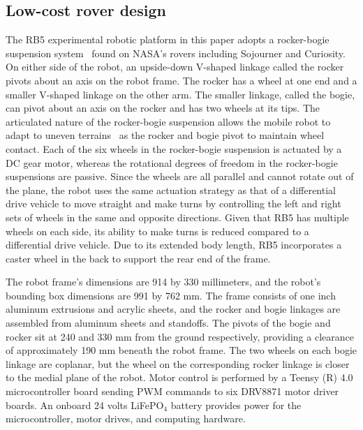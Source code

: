 \documentclass[letterpaper,10pt,conference,twoside]{IEEEtran}
\theoremstyle{definition}
\begin{document}
\subsection{Low-cost %
rover design}
\label{sec:md}
\noindent
The RB5 experimental robotic platform in this paper adopts a rocker-bogie suspension system~\cite{bickler1989articulated} found on NASA's rovers including Sojourner and Curiosity. On either side of the robot, an upside-down V-shaped linkage called the rocker pivots about an axis on the robot frame. The rocker has a wheel at one end and a smaller V-shaped linkage on the other arm. The smaller linkage, called the bogie, can pivot about an axis on the rocker and has two wheels at its tips. The articulated nature of the rocker-bogie suspension allows the mobile robot to adapt to uneven terrains~\cite{%
faisal2021low} as the rocker and bogie pivot to maintain wheel contact. %
%
Each of the six wheels in the rocker-bogie suspension is actuated by a DC gear motor, whereas the rotational degrees of freedom in the rocker-bogie suspensions are passive. Since the wheels are all parallel and cannot rotate out of the plane, the robot uses the same actuation strategy as that of a differential drive vehicle to move straight and make turns by controlling the left and right sets of wheels in the same and opposite directions. Given that RB5 has multiple wheels on each side, its ability to make turns is reduced compared to a differential drive vehicle. Due to its extended body length, RB5 incorporates a caster wheel in the back to support the rear end of the frame.

The robot frame's dimensions are 914 by 330 millimeters, and the robot's bounding box dimensions are 991 by 762 mm. The frame consists of one inch aluminum extrusions and acrylic sheets, and the rocker and bogie linkages are assembled from aluminum sheets and standoffs. The pivots of the bogie and rocker sit at 240 and 330 mm from the ground respectively, providing a clearance of approximately 190 mm beneath the robot frame. The two wheels on each bogie linkage are coplanar, but the wheel on the corresponding rocker linkage is closer to the medial plane of the robot. Motor control is performed by a Teensy (R) 4.0 microcontroller board sending PWM commands to six DRV8871 motor driver boards. An onboard 24 volts LiFePO${}_\text{4}$ battery provides power for the microcontroller, motor drives, and computing hardware.
\end{document}
